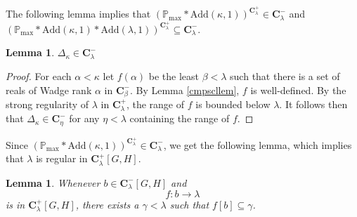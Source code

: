 \documentclass[12pt]{article}
\newtheorem{lemma}[theorem]{Lemma}
\def\bbC{{\mathbf{C}}}
\renewcommand{\models}{\vDash}
\newcommand{\Add}{\mathrm{Add}}
\newcommand{\pmax}{\mathbb{P}_{\mathrm{max}}}
\newcommand{\cP}{\mathcal{P}}
\newcommand{\less}{\mathord{<}}
\newcommand{\restrict}{\mathord{\upharpoonright}}
\begin{document}
The following lemma implies that $(\pmax * \Add(\kappa, 1))^{\bbC^{+}_{\lambda}} \in \bbC^{-}_{\lambda}$ and
$(\pmax * \Add(\kappa, 1) * \Add(\lambda, 1))^{\bbC^{+}_{\lambda}} \subseteq \bbC^{-}_{\lambda}$.


\begin{lemma}\label{dkcontlem} $\Delta_{\kappa} \in \bbC^{-}_{\lambda}$
\end{lemma}

\begin{proof} For each $\alpha < \kappa$ let $f(\alpha)$ be the least $\beta < \lambda$ such that there is a set of reals of Wadge rank $\alpha$ in $\bbC^{-}_{\beta}$. By Lemma \ref{cmpscllem}, $f$ is well-defined.
By the strong regularity of $\lambda$ in $\bbC^{+}_{\lambda}$, the range of $f$ is bounded below $\lambda$.
It follows then that $\Delta_{\kappa} \in \bbC^{-}_{\eta}$ for any $\eta < \lambda$ containing the range of $f$.
\end{proof}




Since $(\pmax * \Add(\kappa, 1))^{\bbC^{+}_{\lambda}} \in \bbC^{-}_{\lambda}$, we get the following lemma, which implies that $\lambda$ is regular in $\bbC^{+}_{\lambda}[G,H]$.

\begin{lemma}\label{strongregghlem} Whenever
$b\in \bbC^-_{\lambda}[G,H]$ and
\[f \colon b \to \lambda\] is in $\bbC_{\lambda}^{+}[G,H]$,  there exists a $\gamma<\lambda$ such that $f[b]\subseteq \gamma$.
\end{lemma}





\end{document}
